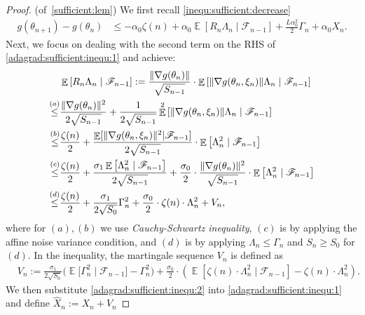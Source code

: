 \documentclass[standalone]{article}
\DeclareMathOperator{\Expect}{\mathbb{E}}
\begin{document}
\begin{proof}(of~\cref{sufficient:lem})
We first recall \cref{inequ:sufficient:decrease}
\begin{align}\label{adagrad:sufficient:inequ:1}
g(\theta_{n+1})-g(\theta_{n}) & \le - \alpha_{0}\zeta(n)+\alpha_{0}\Expect\left[R_n \Lambda_n \mid \mathscr{F}_{n-1}\right]+\frac{ L\alpha_{0}^{2}}{2}\Gamma_n +\alpha_0 X_{n} .
\end{align} 
Next, we focus on dealing with the second term on the RHS of \cref{adagrad:sufficient:inequ:1} and achieve:
\begin{align}\label{adagrad:sufficient:inequ:2}
& \Expect\left[R_n \Lambda_n \mid \mathscr{F}_{n-1}\right] := \frac{\|\nabla g(\theta_{n})\|}{\sqrt{S_{n-1}}}\cdot\Expect\left[\|\nabla g(\theta_{n},\xi_{n})\|\Lambda_n \mid \mathscr{F}_{n-1}\right]  \notag \\ \mathop{\le}^{(a)} &\frac{\|\nabla g(\theta_{n})\|^{2}}{2\sqrt{S_{n-1}}}+\frac{1}{2\sqrt{S_{n-1}}}\Expect^{2}\left[\|\nabla g(\theta_{n},\xi_{n})\| \Lambda_n \mid \mathscr{F}_{n-1}\right] \notag \\ \mathop{\le}^{(b)} &\frac{\zeta(n)}{2}+\frac{\Expect[\|\nabla g(\theta_{n},\xi_{n})\|^{2}|\mathscr{F}_{n-1}]}{2\sqrt{S_{n-1}}}\cdot\Expect\left[\Lambda_n^2 \mid \mathscr{F}_{n-1}\right] \notag \\ \mathop{\le}^{(c)}
&\frac{\zeta(n)}{2}+\frac{\sigma_{1}\Expect\left[\Lambda_n^2 \mid \mathscr{F}_{n-1}\right]}{2\sqrt{S_{n-1}}} +\frac{\sigma_{0}}{2}\cdot\frac{\|\nabla g(\theta_{n})\|^{2}}{\sqrt{S_{n-1}}}\cdot \Expect\left[\Lambda_n^2 \mid \mathscr{F}_{n-1}\right] \notag \\
 \mathop{\le}^{(d)}
&\frac{\zeta(n)}{2}+\frac{\sigma_{1}}{2\sqrt{S_{0}}}\Gamma_n^2 +\frac{\sigma_{0}}{2}\cdot \zeta(n) \cdot \Lambda_n^2 +V_{n},
\end{align}
where for $(a), (b)$ we use \emph{Cauchy-Schwartz inequality}, $(c)$ is by applying the affine noise variance condition, and $(d)$ is by applying $\Lambda_n \leq \Gamma_n $  and $S_n \geq S_0$ for $(d)$. In the inequality, the martingale sequence $V_n$ is defined as
\begin{align}\label{notation:Vn}
&V_{n}:=\frac{\sigma_{1}}{2\sqrt{S_{0}}}\Big(\Expect\big[ \Gamma_n^2 \mid \mathscr{F}_{n-1}\big]- \Gamma_n^2 \Big)+\frac{\sigma_{0}}{2}\cdot\left(\Expect\left[\zeta(n)\cdot\Lambda_n^2 \mid \mathscr{F}_{n-1}\right]-\zeta(n) \cdot \Lambda_n^2\right).
\end{align}
We then substitute \cref{adagrad:sufficient:inequ:2} into \cref{adagrad:sufficient:inequ:1} and define $\hat{X}_{n}:=X_{n}+V_{n}$

\end{proof}
\end{document}
